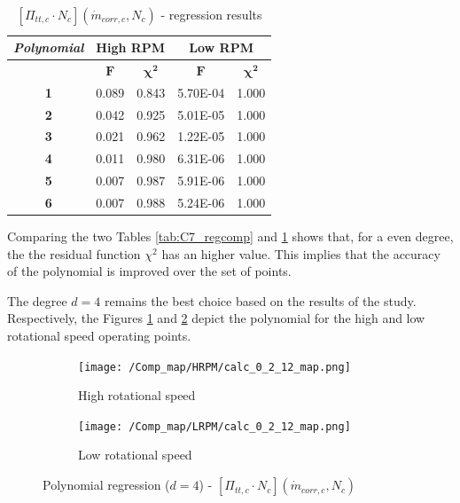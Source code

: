 \begin{longtable}[c]{@{}ccc|cc@{}}
\caption{$[\Pi_{tt,c}\cdot N_c](\dot{m}_{corr,c},N_c)$ - regression results }
\label{tab:C7_regcomp2}\\
\toprule
\textit{\textbf{Polynomial}} & \multicolumn{2}{c|}{High RPM}  & \multicolumn{2}{c}{Low RPM}    \\* \midrule
\endfirsthead
%
\endhead
%
\bottomrule
\endfoot
%
\endlastfoot
%
\multicolumn{1}{c}{\textbf{Degree}}              & \multicolumn{1}{c}{$\mathbf{F}$} & \multicolumn{1}{c|}{$\mathbf{\chi^2}$} & \multicolumn{1}{c}{$\mathbf{F}$} & \multicolumn{1}{c}{$\mathbf{\chi^2}$} \\
\multicolumn{1}{c}{\textbf{1}}                   & 0.089      & 0.843             & 5.70E-04   & 1.000             \\
\multicolumn{1}{c}{\textbf{2}}                   & 0.042      & 0.925             & 5.01E-05   & 1.000             \\
\multicolumn{1}{c}{\textbf{3}}                   & 0.021      & 0.962             & 1.22E-05   & 1.000             \\
\multicolumn{1}{c}{\textbf{4}}                   & 0.011      & 0.980             & 6.31E-06   & 1.000             \\
\multicolumn{1}{c}{\textbf{5}}                   & 0.007      & 0.987             & 5.91E-06   & 1.000             \\
\multicolumn{1}{c}{\textbf{6}}                   & 0.007      & 0.988             & 5.24E-06   & 1.000             \\* \bottomrule
\end{longtable}

Comparing the two Tables \ref{tab:C7_regcomp} and \ref{tab:C7_regcomp2} shows that, for a even degree, the the residual function $\chi^2$ has an higher value. This implies that the accuracy of the polynomial is improved over the set of points. 

The degree $d=4$ remains the best choice based on the results of the study. Respectively, the Figures \ref{fig:C7_polycomp_PN_HRPM} and \ref{fig:C7_polycomp_PN_LRPM} depict the polynomial for the high and low rotational speed operating points.

\begin{figure}[H]
    \centering
    \begin{subfigure}[b]{0.4\textwidth}
        \centering
        \texttt{[image: /Comp\_map/HRPM/calc\_0\_2\_12\_map.png]}
        \caption{High rotational speed}
        \label{fig:C7_polycomp_PN_HRPM}
    \end{subfigure}
    \begin{subfigure}[b]{0.4\textwidth}
        \centering
        \texttt{[image: /Comp\_map/LRPM/calc\_0\_2\_12\_map.png]}
        \caption{Low rotational speed}
        \label{fig:C7_polycomp_PN_LRPM}
    \end{subfigure}
    \caption{Polynomial regression ($d=4$) - $[\Pi_{tt,c}\cdot N_c](\dot{m}_{corr,c},N_c)$} \label{fig:C7_polycomp_PN}
\end{figure}

